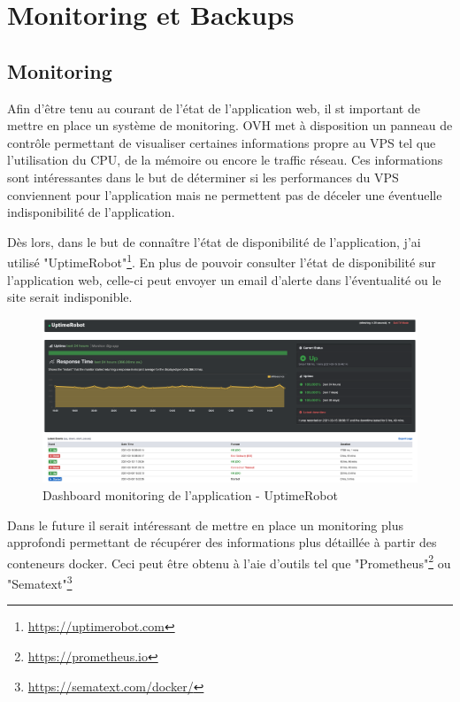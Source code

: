 \section{Monitoring et Backups}

\subsection{Monitoring}
Afin d'être tenu au courant de l'état de l'application web, il st important de mettre en place un système de monitoring. OVH met à disposition un panneau de contrôle permettant de visualiser certaines informations propre au VPS tel que l'utilisation du CPU, de la mémoire ou encore le traffic réseau. Ces informations sont intéressantes dans le but de déterminer si les performances du VPS conviennent pour l'application mais ne permettent pas de déceler une éventuelle indisponibilité de l'application. 

\newpara

Dès lors, dans le but de connaître l'état de disponibilité de l'application, j'ai utilisé "UptimeRobot"\footnote{\url{https://uptimerobot.com}}. En plus de pouvoir consulter l'état de disponibilité sur l'application web, celle-ci peut envoyer un email d'alerte dans l'éventualité ou le site serait indisponible.

\begin{figure}[H]
  \centering
  \includegraphics[width=\linewidth]{img/uptimeRobot.png}
  \caption{Dashboard monitoring de l'application - UptimeRobot}
\end{figure}

\newpara

Dans le future il serait intéressant de mettre en place un monitoring plus approfondi permettant de récupérer des informations plus détaillée à partir des conteneurs docker. Ceci peut être obtenu à l'aie d'outils tel que "Prometheus"\footnote{\url{https://prometheus.io}} ou "Sematext"\footnote{\url{https://sematext.com/docker/}} 

